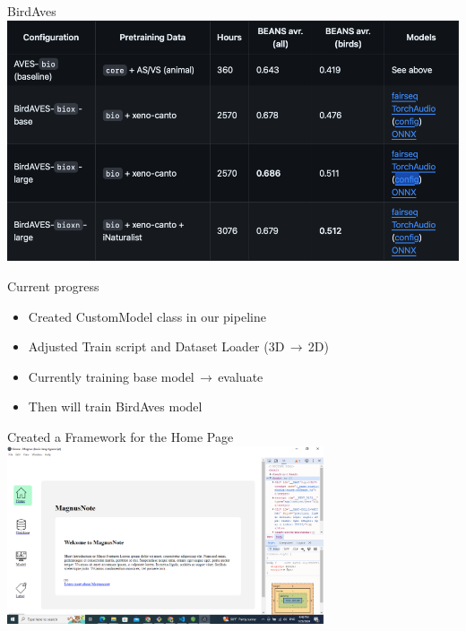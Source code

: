 \begin{frame}{BirdAves}
    \centering
    \includegraphics[height=0.7\textheight,width=1\textwidth,keepaspectratio]{images/BirdAves.png}  
\end{frame}

\begin{frame}{Current progress}
    \begin{itemize}
        \item Created CustomModel class in our pipeline
        \item Adjusted Train script and Dataset Loader (3D$ \,\to\, $2D)
        \item Currently training base model$ \,\to\, $evaluate
        \item Then will train BirdAves model
    \end{itemize}
\end{frame}


\begin{frame}{Created a Framework for the Home Page}
    \centering
    \includegraphics[height=0.7\textheight,width=0.7\textwidth,keepaspectratio]{homepage.png}  
\end{frame}

